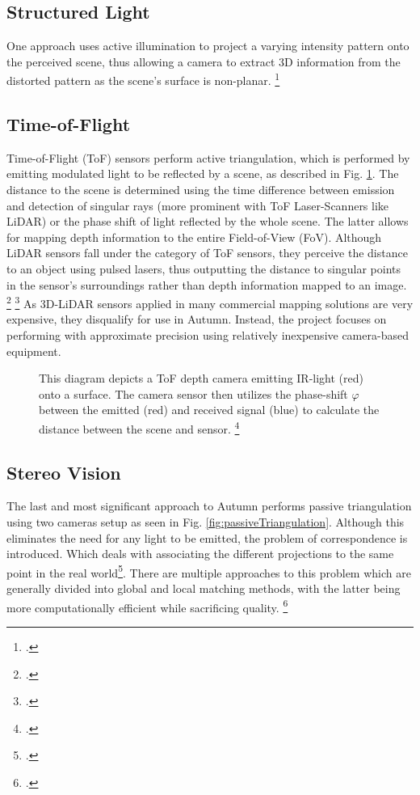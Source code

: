 \subsection{Structured Light}
One approach uses active illumination to project a varying intensity pattern onto the perceived scene, thus allowing a camera to extract 3D information from the distorted pattern as the scene's surface is non-planar. \footcite{geng2011StructuredLight}

\subsection{Time-of-Flight}
Time-of-Flight (ToF) sensors perform active triangulation, which is performed by emitting modulated light to be reflected by a scene, as described in Fig. \ref{fig:activeTriangulation}. The distance to the scene is determined using the time difference between emission and detection of singular rays (more prominent with ToF Laser-Scanners like LiDAR) or the phase shift of light reflected by the whole scene. The latter allows for mapping depth information to the entire Field-of-View (FoV). 
Although LiDAR sensors fall under the category of ToF sensors, they perceive the distance to an object using pulsed lasers, thus outputting
the distance to singular points in the sensor's surroundings rather than depth information mapped to an image. \footcite{gokturk2004time} \footcite{velodyne2021LiDAR}
As 3D-LiDAR sensors applied in many commercial mapping solutions are very expensive, they disqualify for use in Autumn. Instead, the project focuses on performing with approximate precision using relatively inexpensive camera-based equipment. 

\begin{figure}
	\centering
	
	\caption{
		This diagram depicts a ToF depth camera emitting IR-light (red) onto a surface. The camera sensor then utilizes the phase-shift $\varphi$ between the emitted (red) and received signal (blue) to calculate the distance between the scene and sensor. \footcite{altuntas2021triangulation}
	}
	\label{fig:activeTriangulation}
\end{figure}


\subsection{Stereo Vision}
The last and most significant approach to Autumn performs passive triangulation using two cameras setup as seen in Fig. \ref{fig:passiveTriangulation}. Although this eliminates the need for any light to be emitted, the problem of correspondence is introduced. Which deals with associating the different projections to the same point in the real world\footcite{ng2019StereoCorrespondence}. There are multiple approaches to this problem which are generally divided into global and local matching methods, with the latter being more computationally efficient while sacrificing quality. \footcite{do2019review}


